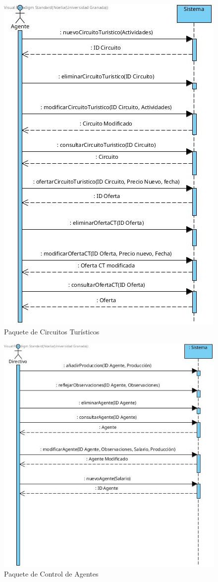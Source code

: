 \documentclass{article}
\begin{document}
	\begin{figure}[H]
		\centering
		\includegraphics[totalheight=12cm]{Paquete_4}
		\caption{Paquete de Circuitos Turísticos}
		\label{fig:p4}
	\end{figure}

	\begin{figure}[H]
		\centering
		\includegraphics[totalheight=12cm]{Paquete_5}
		\caption{Paquete de Control de Agentes}
		\label{fig:p5}
	\end{figure}
\end{document}

